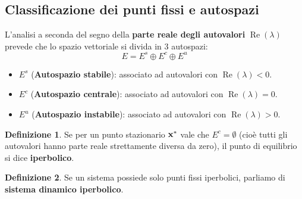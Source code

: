 \documentclass[openany]{book}
\theoremstyle{definition}
\newtheorem*{definizione}{Definizione}
\theoremstyle{remark}
\begin{document}
\subsection*{Classificazione dei punti fissi e autospazi}
L'analisi a seconda del segno della \textbf{parte reale degli autovalori} $\operatorname{Re}(\lambda)$ prevede che lo spazio vettoriale si divida in 3 autospazi:
\begin{equation}
    E = E^s \oplus E^c \oplus E^u
\end{equation}

\begin{itemize}
    \item $E^s$ (\textbf{Autospazio stabile}): associato ad autovalori con $\operatorname{Re}(\lambda) < 0$.
    \item $E^c$ (\textbf{Autospazio centrale}): associato ad autovalori con $\operatorname{Re}(\lambda) = 0$.
    \item $E^u$ (\textbf{Autospazio instabile}): associato ad autovalori con $\operatorname{Re}(\lambda) > 0$.
\end{itemize}

\begin{definizione}
Se per un punto stazionario $\vb{x}^*$ vale che $E^c = \emptyset$ (cioè tutti gli autovalori hanno parte reale strettamente diversa da zero), il punto di equilibrio si dice \textbf{iperbolico}.
\end{definizione}

\begin{definizione}
Se un sistema possiede solo punti fissi iperbolici, parliamo di \textbf{sistema dinamico iperbolico}.
\end{definizione}
\end{document}
